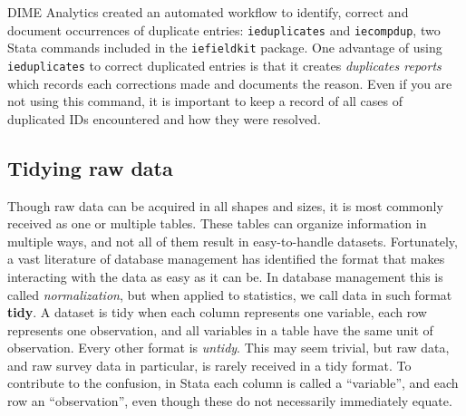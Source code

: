 DIME Analytics created an automated workflow to identify, correct and document
occurrences of duplicate entries:
\texttt{ieduplicates} and \texttt{iecompdup},
two Stata commands included in the \texttt{iefieldkit}
package. 
One advantage of using \texttt{ieduplicates} 
to correct duplicated entries is that it creates \textit{duplicates reports}
which records each corrections made and documents the reason.
Even if you are not using this command,
it is important to keep a record of all cases of duplicated IDs encountered
 and how they were resolved.


\subsection{Tidying raw data}
Though raw data can be acquired in all shapes and sizes,
it is most commonly received as one or multiple tables.
These tables can organize information in multiple ways,
and not all of them result in easy-to-handle datasets.
Fortunately, a vast literature of database management has identified the format
that makes interacting with the data as easy as it can be.
In database management this is called \textit{normalization},
but when applied to statistics, we call data in such format \textbf{tidy}.
A dataset is tidy when each column represents one variable,
each row represents one observation, 
and all variables in a table have the same unit of observation.
Every other format is \textit{untidy}.
This may seem trivial, but raw data, 
and raw survey data in particular,
is rarely received in a tidy format.
To contribute to the confusion, 
in Stata each column is called a ``variable'', 
and each row an ``observation'',
even though these do not necessarily immediately equate.

